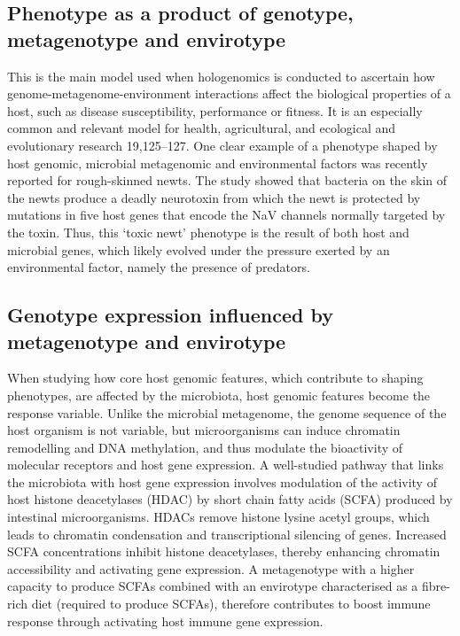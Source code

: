 \documentclass[
]{book}
\begin{document}
\hypertarget{p-g-m-e}{%
\subsection*{Phenotype as a product of genotype, metagenotype and envirotype}\label{p-g-m-e}}

This is the main model used when hologenomics is conducted to ascertain how genome-metagenome-environment interactions affect the biological properties of a host, such as disease susceptibility, performance or fitness. It is an especially common and relevant model for health, agricultural, and ecological and evolutionary research 19,125--127. One clear example of a phenotype shaped by host genomic, microbial metagenomic and environmental factors was recently reported for rough-skinned newts. The study showed that bacteria on the skin of the newts produce a deadly neurotoxin from which the newt is protected by mutations in five host genes that encode the NaV channels normally targeted by the toxin. Thus, this `toxic newt' phenotype is the result of both host and microbial genes, which likely evolved under the pressure exerted by an environmental factor, namely the presence of predators.

\hypertarget{g-m-e}{%
\subsection*{Genotype expression influenced by metagenotype and envirotype}\label{g-m-e}}

When studying how core host genomic features, which contribute to shaping phenotypes, are affected by the microbiota, host genomic features become the response variable. Unlike the microbial metagenome, the genome sequence of the host organism is not variable, but microorganisms can induce chromatin remodelling and DNA methylation, and thus modulate the bioactivity of molecular receptors and host gene expression. A well-studied pathway that links the microbiota with host gene expression involves modulation of the activity of host histone deacetylases (HDAC) by short chain fatty acids (SCFA) produced by intestinal microorganisms. HDACs remove histone lysine acetyl groups, which leads to chromatin condensation and transcriptional silencing of genes. Increased SCFA concentrations inhibit histone deacetylases, thereby enhancing chromatin accessibility and activating gene expression. A metagenotype with a higher capacity to produce SCFAs combined with an envirotype characterised as a fibre-rich diet (required to produce SCFAs), therefore contributes to boost immune response through activating host immune gene expression.
\end{document}
